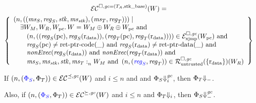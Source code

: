 \documentclass[acmsmall,review,anonymous]{acmart}\settopmatter{printfolios=true,printccs=false,printacmref=false}
\renewcommand{\nonExec}[1]{\plainfun{nonExec}{#1}}
\begin{document}
\begin{multline*}
  \lrec[\square,\gc = (\ta,\stkb)](W) = \\
\left\{
  \begin{array}{l}
     \npair{\left(
    (\ms_S,\reg_S,\stk,\ms_\stk),
    (\ms_T,\reg_T)\right)} \mid \\
    \quad \exists W_M,W_R,W_\pcreg \ldotp W = W_M \oplus W_R \oplus W_\pcreg \tand\\
    \qquad \npair{( (\reg_S(\pcreg),\reg_S(\rdata)), (\reg_T(\pcreg),\reg_T(\rdata)) )} \in \lrexj(W_\pcreg) \tand \\
    \qquad \reg_S(\pcreg) \neq \retptrc(\_) \tand
    \reg_S(\rdata) \neq \retptrd(\_) \tand \\
    \qquad \nonExec{\reg_S(\rdata)} \tand  
     \nonExec{\reg_T(\rdata)} \tand \\
    \qquad \memSat{\ms_S,\ms_\stk,\stk,\ms_T}{W_M} \tand \npair{\stpair{\reg}{\reg}} \in \lrr(\{\rdata\})(W_R)
  \end{array}
\right\}
\end{multline*}
\begin{lemma}
  \label{lem:adequacy}
  If $\npair{\stpair{\Phi}{\Phi}}\in\lrec[\preceq,\gc](W)$ and
 $i \leq n$ and
and $\Phi_S \sterm[i]{\gc}$,
  then $\Phi_T\term$.

  Also, if
 $\npair{\stpair{\Phi}{\Phi}}\in\lrec[\succeq,\gc](W)$ and
 $i \leq n$
and $\Phi_T \term[i]$,
  then $\Phi_S\sterm{\gc}$.
\end{lemma}
\end{document}
